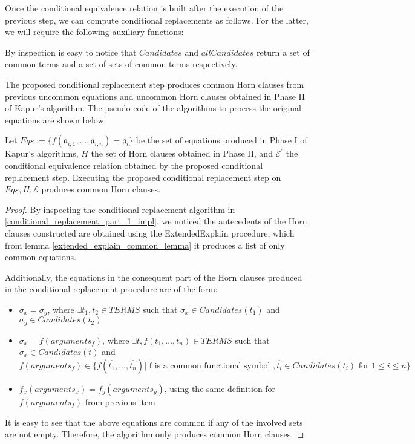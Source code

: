 Once the conditional equivalence relation is built after 
the execution of the previous step, we can compute conditional
replacements as follows. For the latter, we will require 
the following auxiliary functions:




By inspection is easy to notice that $Candidates$ 
and $allCandidates$ return a set of common terms and
a set of sets of common terms respectively.

The proposed conditional replacement step produces common Horn 
clauses from previous uncommon equations and uncommon Horn 
clauses obtained in Phase II of Kapur's algorithm.
The pseudo-code of the algorithms to 
process the original equations are shown below:




\begin{lemma} \label{conditional_replacement_lemma}
  Let $Eqs := \{f(\mathfrak{a}_{i, 1}, \dots, \mathfrak{a}_{i, n}) 
  = \mathfrak{a}_i\}$ be the set of equations produced
  in Phase I of Kapur's algorithms, $H$ the set of 
  Horn clauses obtained in Phase II, and $\mathcal{E^{'}}$ the 
  conditional equivalence
  relation obtained by the proposed conditional replacement
  step.
  Executing the proposed conditional replacement step
  on $Eqs, H, \mathcal{E}$ produces common Horn clauses.
\end{lemma}

\begin{proof}
  By inspecting the conditional replacement algorithm 
  in \ref{conditional_replacement_part_1_impl},
  we noticed the antecedents of the Horn clauses 
  constructed are obtained using the ExtendedExplain 
  procedure, which from lemma \ref{extended_explain_common_lemma} 
  it produces a list of only common equations.

  Additionally, the equations in the consequent part 
  of the Horn clauses produced in the conditional replacement 
  procedure are of the form:

  \begin{itemize}
    \item $\sigma_x = \sigma_y$, 
      where $\exists t_1, t_2 \in TERMS$
      such that $\sigma_x \in Candidates(t_1)$ and 
      $\sigma_y \in Candidates(t_2)$
    \item $\sigma_x = f(arguments_{f})$, 
      where $\exists t, f(t_1, \dots, t_n) \in TERMS$
      such that $\sigma_x \in Candidates(t)$ and
      $f(arguments_f) \in \{f(\hat{t_1}, \dots, \hat{t_n})
        | \text{ f is a common functional symbol },
        \hat{t_i} \in Candidates(t_i) \text{ for } 1 \leq i \leq n
      \}$
    \item $f_x(arguments_x) = f_y(arguments_y)$, using the same
      definition for $f(arguments_f)$ from previous item
  \end{itemize}

  It is easy to see that the above equations are common if any
  of the involved sets are not empty. Therefore, the algorithm 
  only produces common Horn clauses.
\end{proof}

